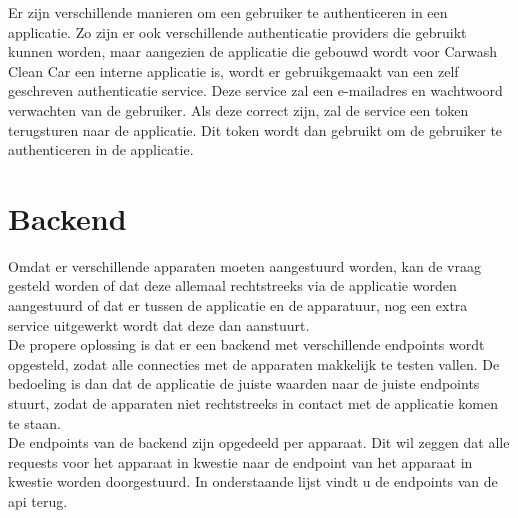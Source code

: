 Er zijn verschillende manieren om een gebruiker te authenticeren in een applicatie. Zo zijn er ook verschillende authenticatie providers die gebruikt kunnen worden, maar aangezien de applicatie die gebouwd wordt voor Carwash Clean Car een interne applicatie is, wordt er gebruikgemaakt van een zelf geschreven authenticatie service. Deze service zal een e-mailadres en wachtwoord verwachten van de gebruiker. Als deze correct zijn, zal de service een token terugsturen naar de applicatie. Dit token wordt dan gebruikt om de gebruiker te authenticeren in de applicatie.

\section{Backend}
\label{sec:stand-van-zaken-backend}

Omdat er verschillende apparaten moeten aangestuurd worden, kan de vraag gesteld worden of dat deze allemaal rechtstreeks via de applicatie worden aangestuurd of dat er tussen de applicatie en de apparatuur, nog een extra service uitgewerkt wordt dat deze dan aanstuurt.\\

De propere oplossing is dat er een backend met verschillende endpoints wordt opgesteld, zodat alle connecties met de apparaten makkelijk te testen vallen. De bedoeling is dan dat de applicatie de juiste waarden naar de juiste endpoints stuurt, zodat de apparaten niet rechtstreeks in contact met de applicatie komen te staan.\\

De endpoints van de backend zijn opgedeeld per apparaat. Dit wil zeggen dat alle requests voor het apparaat in kwestie naar de endpoint van het apparaat in kwestie worden doorgestuurd. In onderstaande lijst vindt u de endpoints van de api terug.

